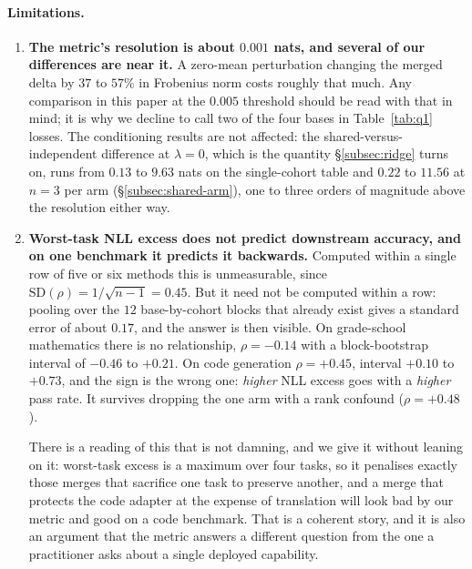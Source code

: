 \paragraph{Limitations.}
\begin{enumerate}
\item \textbf{The metric's resolution is about $0.001$ nats, and several of
  our differences are near it.} A zero-mean perturbation changing the merged
  delta by $37$ to $57\%$ in Frobenius norm costs roughly that much. Any
  comparison in this paper at the $0.005$ threshold should be read with that
  in mind; it is why we decline to call two of the four bases in
  Table~\ref{tab:q1} losses. The conditioning results are not affected: the
  shared-versus-independent difference at $\lambda = 0$, which is the quantity
  \S\ref{subsec:ridge} turns on, runs from $0.13$ to $9.63$ nats on the
  single-cohort table and $0.22$ to $11.56$ at $n = 3$ per arm
  (\S\ref{subsec:shared-arm}), one to three orders of magnitude above the
  resolution either way.
\item \textbf{Worst-task NLL excess does not predict downstream accuracy,
  and on one benchmark it predicts it backwards.} Computed within a single
  row of five or six methods this is unmeasurable, since
  $\mathrm{SD}(\rho) = 1/\sqrt{n-1} = 0.45$. But it need not be computed
  within a row: pooling over the $12$ base-by-cohort blocks that already
  exist gives a standard error of about $0.17$, and the answer is then
  visible. On grade-school
  mathematics there is no relationship, $\rho = -0.14$ with a
  block-bootstrap interval of $-0.46$ to $+0.21$. On code generation
  $\rho = +0.45$, interval $+0.10$ to $+0.73$, and the sign is the wrong
  one: \emph{higher} NLL excess goes with a \emph{higher} pass rate. It
  survives dropping the one arm with a rank confound ($\rho = +0.48$).

  There is a reading of this that is not damning, and we give it without
  leaning on it: worst-task excess is a maximum over four tasks, so it
  penalises exactly those merges that sacrifice one task to preserve
  another, and a merge that protects the code adapter at the expense of
  translation will look bad by our metric and good on a code benchmark.
  That is a coherent story, and it is also an argument that the metric
  answers a different question from the one a practitioner asks about a
  single deployed capability.


\end{enumerate}
